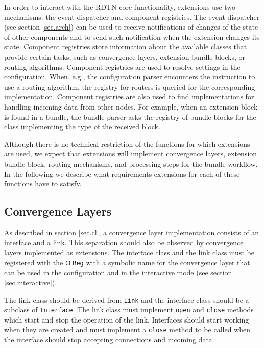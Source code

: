 \documentclass[a4paper]{article}
\begin{document}
In order to interact with the RDTN core-functionality, extensions use two
mechanisms: the event dispatcher and component registries. The event dispatcher
(see section \ref{sec.arch}) can be used to receive notifications of changes of
the state of other components and to send such notification when the extension
changes its state. Component registries store information about the available
classes that provide certain tasks, such as convergence layers, extension bundle
blocks, or routing algorithms. Component registries are used to resolve settings
in the configuration. When, e.g., the configuration parser encounters the
instruction to use a routing algorithm, the registry for routers is queried for
the corresponding implementation. Component registries are also used to find
implementations for handling incoming data from other nodes. For example, when
an extension block is found in a bundle, the bundle parser asks the registry of
bundle blocks for the class implementing the type of the received block.

Although there is no technical restriction of the functions for which extensions
are used, we expect that extensions will implement convergence layers,
extension bundle block, routing mechanisms, and processing steps for the bundle
workflow. In the following we describe what requirements extensions for each of
these functions have to satisfy.

\subsection{Convergence Layers}\label{sec.ext.cls}

As described in section \ref{sec.cl}, a convergence layer implementation
consists of an interface and a link. This separation should also be observed by
convergence layers implemented as extensions. The interface class and the link
class must be registered with the {\tt CLReg} with a symbolic name for the
convergence layer that can be used in the configuration and in the interactive
mode (see section \ref{sec.interactive}).

The link class should be derived from {\tt Link} and the interface class should
be a subclass of {\tt Interface}.  The link class must implement {\tt open} and
{\tt close} methods which start and stop the operation of the link. Interfaces
should start working when they are created and must implement a {\tt close}
method to be called when the interface should stop accepting connections and
incoming data.
\end{document}
